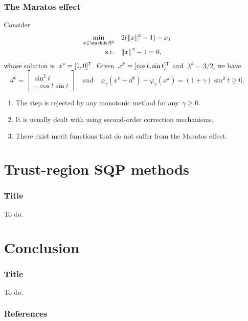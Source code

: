 \documentclass{polyu-presentation}
\begin{document}
\begin{frame}
    \frametitle{The Maratos effect}

    Consider
    \begin{align*}
        \min_{x \in \R^2}   & \quad 2(\norm{x}^2 - 1) - x_1\\
        \text{s.t.}         & \quad \norm{x}^2 - 1 = 0,
    \end{align*}
    whose \alert{solution} is~$x^{\ast} = [1, 0]^{\mathsf{T}}$.
    Given~$x^k = [\cos t, \sin t]^{\mathsf{T}}$ and~$\lambda^k = 3/2$, we have
    \begin{equation*}
        d^k =
        \begin{bmatrix}
            \sin^2 t\\
            - \cos t \sin t
        \end{bmatrix}
        \quad \text{and} \quad
        \varphi_{\gamma}(x^k + d^k) - \varphi_{\gamma}(x^k) = (1 + \gamma) \sin^2 t \ge 0.
    \end{equation*}

    \begin{block}{}
        \begin{enumerate}[<+(1)->]
            \item The step is \alert{rejected} by any \alert{monotonic} method for any~$\gamma \ge 0$.
            \item It is usually dealt with using \alert{second-order correction} mechanisms.
            \item There exist merit functions that \alert{do not suffer} from the Maratos effect.
        \end{enumerate}
    \end{block}
\end{frame}

\section{Trust-region SQP methods}

\begin{frame}
    \frametitle{Title}

	To do.
\end{frame}

\section{Conclusion}

\begin{frame}
    \frametitle{Title}

	To do.
\end{frame}

\begin{frame}[t,allowframebreaks]
    \frametitle{References}

	\printbibliography
\end{frame}
\end{document}

